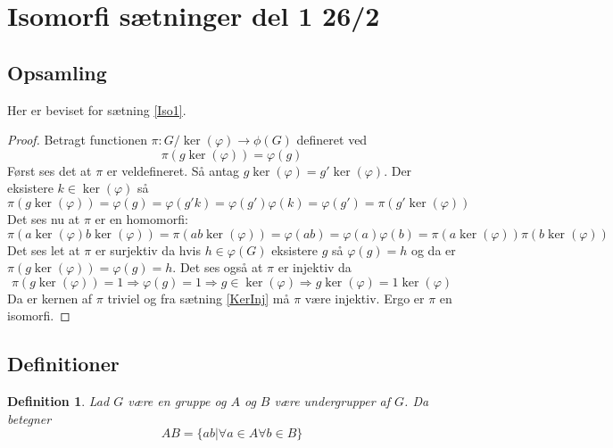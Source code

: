 \documentclass{article}
\newcommand{\imp}{\Rightarrow}
\newcommand{\too}{\rightarrow}
\newtheorem{defi}{Definition}
\begin{document}
	\section*{Isomorfi sætninger del 1 26/2}
		\subsection*{Opsamling}
		Her er beviset for sætning \ref{Iso1}.
		\begin{proof}
			Betragt functionen $\pi: G/\ker(\varphi) \too \phi(G)$ defineret ved
			$$\pi(g\ker(\varphi)) = \varphi(g)$$
			Først ses det at $\pi$ er veldefineret. Så antag $g\ker(\varphi) = g'\ker(\varphi)$.
			Der eksistere $k \in \ker(\varphi)$ så
			$$\pi(g\ker(\varphi)) = \varphi(g) = \varphi(g'k) = \varphi(g')\varphi(k)=\varphi(g') =
			\pi(g'\ker(\varphi))$$
			Det ses nu at $\pi$ er en homomorfi:
			$$\pi(a\ker(\varphi)b\ker(\varphi)) = \pi(ab\ker(\varphi)) = \varphi(ab) =
			\varphi(a)\varphi(b)=\pi(a\ker(\varphi))\pi(b\ker(\varphi))$$
			Det ses let at $\pi$ er surjektiv da hvis $h \in \varphi(G)$ eksistere $g$
			så $\varphi(g) = h$ og da er $\pi(g\ker(\varphi)) = \varphi(g) = h$.
			Det ses også at $\pi$ er injektiv da
			$$\pi(g\ker(\varphi)) = 1 \imp \varphi(g) = 1 \imp g \in \ker(\varphi) \imp
			g\ker(\varphi) = 1\ker(\varphi)$$
			Da er kernen af $\pi$ triviel og fra sætning \ref{KerInj} må $\pi$ være injektiv.
			Ergo er $\pi$ en isomorfi.
		\end{proof}
		\subsection*{Definitioner}
		\begin{defi}
			Lad $G$ være en gruppe og $A$ og $B$ være undergrupper af $G$. Da betegner
			$$AB = \{ab | \forall a \in A \forall b \in B\}$$
		\end{defi}
\end{document}
